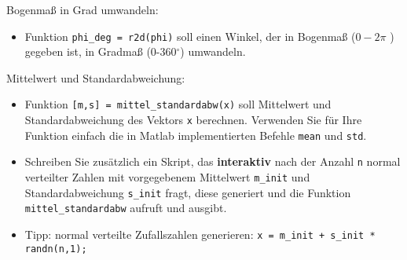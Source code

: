   \secMexercise
  \begin{frame}
      \frameMexercise
      \begin{exercise}
          \sloppy
          Bogenmaß in Grad umwandeln:
          \begin{itemize}
            \item Funktion \texttt{phi\_deg = r2d(phi)} soll einen Winkel, der in Bogenmaß ($0-2\pi$ ) gegeben ist, in Gradmaß (0-360$^{\circ}$) umwandeln.
          \end{itemize}
      \end{exercise}
  \end{frame}

  \secMexercise
  \begin{frame}
      \frameMexercise
      \begin{exercise}
          \sloppy
          Mittelwert und Standardabweichung:
          \begin{itemize}
            \item Funktion \texttt{[m,s] = mittel\_standardabw(x)} soll Mittelwert und Standardabweichung des Vektors \texttt{x} berechnen. Verwenden Sie für Ihre Funktion einfach die in Matlab implementierten Befehle \texttt{mean} und \texttt{std}.
            \item Schreiben Sie zusätzlich ein Skript, das \textbf{interaktiv} nach der Anzahl \texttt{n} normal verteilter Zahlen mit vorgegebenem
            Mittelwert \texttt{m\_init} und Standardabweichung \texttt{s\_init} fragt, diese generiert und die Funktion
            \texttt{mittel\_standardabw} aufruft und ausgibt.
            \item Tipp: normal verteilte Zufallszahlen generieren: \texttt{x = m\_init + s\_init * randn(n,1);}
          \end{itemize}
      \end{exercise}
  \end{frame}

